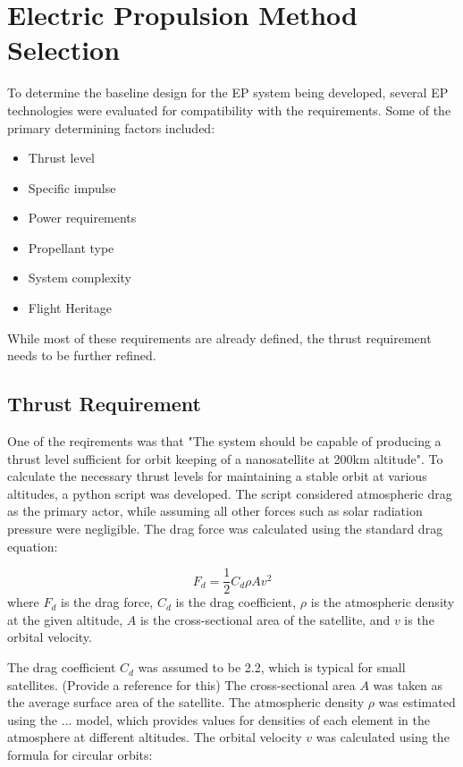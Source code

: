 \section{Electric Propulsion Method Selection}

To determine the baseline design for the \ac{EP} system being developed, several EP technologies were evaluated for compatibility with the requirements. Some of the primary determining factors included:

\begin{itemize}
    \item Thrust level
    \item Specific impulse
    \item Power requirements
    \item Propellant type
    \item System complexity
    \item Flight Heritage
\end{itemize}

While most of these requirements are already defined, the thrust requirement needs to be further refined.

\subsection{Thrust Requirement}
One of the reqirements was that "The system should be capable of producing a thrust level sufficient for orbit keeping of a nanosatellite at 200km altitude". To calculate the necessary thrust levels for maintaining a stable orbit at various altitudes, a python script was developed. The script considered atmospheric drag as the primary actor, while assuming all other forces such as solar radiation pressure were negligible. The drag force was calculated using the standard drag equation:

\begin{equation}
    F_d = \frac{1}{2} C_d \rho A v^2
\end{equation}
where \( F_d \) is the drag force, \( C_d \) is the drag coefficient, \( \rho \) is the atmospheric density at the given altitude, \( A \) is the cross-sectional area of the satellite, and \( v \) is the orbital velocity.

The drag coefficient \( C_d \) was assumed to be 2.2, which is typical for small satellites. (Provide a reference for this) 
The cross-sectional area \( A \) was taken as the average surface area of the satellite.
The atmospheric density \( \rho \) was estimated using the ... model, which provides values for densities of each element in the atmosphere at different altitudes.
The orbital velocity \( v \) was calculated using the formula for circular orbits:

